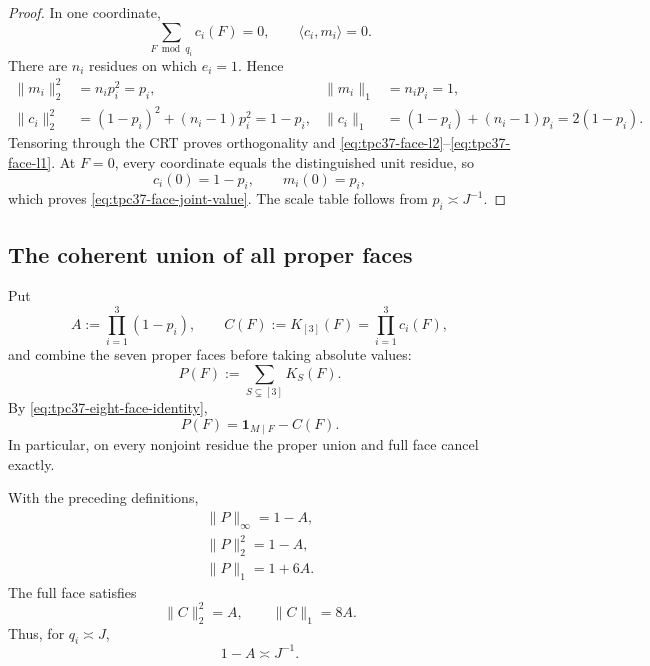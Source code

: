 \begin{proof}
In one coordinate,
\begin{equation}
 \sum_{F\bmod q_i}c_i(F)=0,
 \qquad
 \langle c_i,m_i\rangle=0.
 \label{eq:tpc37-one-coordinate-orthogonality}
\end{equation}
There are \(n_i\) residues on which \(e_i=1\).  Hence
\begin{align}
 \|m_i\|_2^2&=n_i p_i^2=p_i,
 &\|m_i\|_1&=n_i p_i=1,
 \label{eq:tpc37-principal-coordinate-norms}\\
 \|c_i\|_2^2
 &=(1-p_i)^2+(n_i-1)p_i^2=1-p_i,
 &\|c_i\|_1
 &=(1-p_i)+(n_i-1)p_i=2(1-p_i).
 \label{eq:tpc37-centered-coordinate-norms}
\end{align}
Tensoring through the CRT proves orthogonality and
\eqref{eq:tpc37-face-l2}--\eqref{eq:tpc37-face-l1}.  At \(F=0\), every
coordinate equals the distinguished unit residue, so
\begin{equation}
 c_i(0)=1-p_i,
 \qquad m_i(0)=p_i,
 \label{eq:tpc37-coordinate-joint-values}
\end{equation}
which proves \eqref{eq:tpc37-face-joint-value}.  The scale table follows
from \(p_i\asymp J^{-1}\).
\end{proof}

\subsection{The coherent union of all proper faces}

Put
\begin{equation}
 A:=\prod_{i=1}^3(1-p_i),
 \qquad
 C(F):=K_{[3]}(F)=\prod_{i=1}^3c_i(F),
 \label{eq:tpc37-full-face-A}
\end{equation}
and combine the seven proper faces before taking absolute values:
\begin{equation}
 P(F):=\sum_{S\subsetneq[3]}K_S(F).
 \label{eq:tpc37-proper-union-definition}
\end{equation}
By \eqref{eq:tpc37-eight-face-identity},
\begin{equation}
 \boxed{P(F)=\mathbf 1_{M\mid F}-C(F).}
 \label{eq:tpc37-proper-union-identity}
\end{equation}
In particular, on every nonjoint residue the proper union and full face
cancel exactly.

\begin{theorem}
\label{thm:tpc37-proper-union-norms}
With the preceding definitions,
\begin{align}
 \boxed{\|P\|_\infty=1-A,}
 \label{eq:tpc37-proper-linf}\\
 \boxed{\|P\|_2^2=1-A,}
 \label{eq:tpc37-proper-l2}\\
 \boxed{\|P\|_1=1+6A.}
 \label{eq:tpc37-proper-l1}
\end{align}
The full face satisfies
\begin{equation}
 \|C\|_2^2=A,
 \qquad
 \|C\|_1=8A.
 \label{eq:tpc37-full-face-norms}
\end{equation}
Thus, for \(q_i\asymp J\),
\begin{equation}
 1-A\asymp J^{-1}.
 \label{eq:tpc37-proper-one-over-J}
\end{equation}
\end{theorem}

